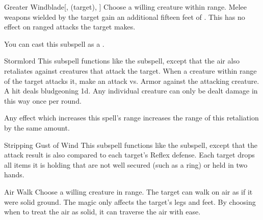\begin{ability}[\nth{3}]{Greater Windblade}[,  (target), ]
Choose a willing creature within \rngclose range.
Melee weapons wielded by the target gain an additional fifteen feet of .
This has no effect on ranged attacks the target makes.

You can cast this subspell as a .
\end{ability}
\vspace{0.25em}



\begin{ability}[\nth{3}]{Stormlord}
This subspell functions like the  subspell, except that the air also retaliates against creatures that attack the target.
When a creature within \rngclose range of the target attacks it, make an attack vs. Armor against the attacking creature.
A hit deals bludgeoning  \minus1d.
Any individual creature can only be dealt damage in this way once per round.

Any effect which increases this spell's range increases the range of this retaliation by the same amount.
\end{ability}
\vspace{0.25em}



\begin{ability}[\nth{3}]{Stripping Gust of Wind}
This subspell functions like the  subspell, except that the attack result is also compared to each target's Reflex defense.
\hit Each target drops all items it is holding that are not well secured (such as a ring) or held in two hands.
\end{ability}
\vspace{0.25em}



\begin{ability}[\nth{4}]{Air Walk}
Choose a willing creature in \rngclose range.
The target can walk on air as if it were solid ground.
The magic only affects the target's legs and feet.
By choosing when to treat the air as solid, it can traverse the air with ease.
\end{ability}
\vspace{0.25em}



